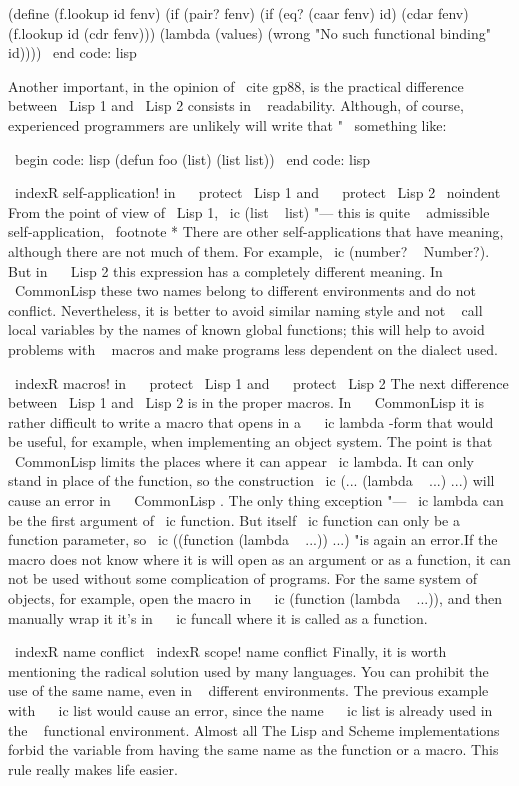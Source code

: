 (define (f.lookup id fenv)
  (if (pair? fenv)
      (if (eq? (caar fenv) id)
          (cdar fenv)
          (f.lookup id (cdr fenv)))
      (lambda (values)
        (wrong "No such functional binding" id))))
\ end {code: lisp}

Another important, in the opinion of \ cite {gp88}, is the practical difference between \ Lisp 1 and
\ Lisp 2 consists in ~ readability. Although, of course, experienced programmers are unlikely
will write that "~ something like:

\ begin {code: lisp}
(defun foo (list)
  (list list))
\ end {code: lisp}

\ indexR {self-application! in ~ \ protect \ Lisp 1 and ~ \ protect \ Lisp 2}
\ noindent
From the point of view of \ Lisp 1, \ ic {(list ~ list)} "--- this is quite ~ admissible
self-application, \ footnote * {There are other self-applications that have
meaning, although there are not much of them. For example, \ ic {(number? ~ Number?)}.} But in ~ \ Lisp 2
this expression has a completely different meaning. In ~ { \ CommonLisp } these two names
belong to different environments and do not conflict. Nevertheless, it is better to avoid
similar naming style and not ~ call local variables by the names of known
global functions; this will help to avoid problems with ~ macros and make programs
less dependent on the dialect used.

\ indexR {macros! in ~ \ protect \ Lisp 1 and ~ \ protect \ Lisp 2}
The next difference between \ Lisp 1 and \ Lisp 2 is in the proper macros.
In ~ { \ CommonLisp } it is rather difficult to write a macro that opens
in a ~ \ ic {lambda} -form that would be useful, for example, when implementing an object
system. The point is that { \ CommonLisp } limits the places where it can appear
\ ic {lambda}. It can only stand in place of the function, so the construction
\ ic {(... (lambda ~ ...) ...)} will cause an error in ~ { \ CommonLisp }. The only thing
exception "--- \ ic {lambda} can be the first argument of \ ic {function}. But itself
\ ic {function} can only be a function parameter, so \ ic {((function
(lambda ~ ...)) ...)} "is again an error.If the macro does not know where it is
will open as an argument or as a function, it can not be used without
some complication of programs. For the same system of objects, for example,
open the macro in ~ \ ic {(function (lambda ~ ...))}, and then manually wrap it
it's in ~ \ ic {funcall} where it is called as a function.

\ indexR {name conflict}
\ indexR {scope! name conflict}
Finally, it is worth mentioning the radical solution used by many languages.
You can prohibit the use of the same name, even in ~ different
environments. The previous example with ~ \ ic {list} would cause an error, since
the name ~ \ ic {list} is already used in the ~ functional environment. Almost all
The Lisp and Scheme implementations forbid the variable from having the same name as the function
or a macro. This rule really makes life easier.


